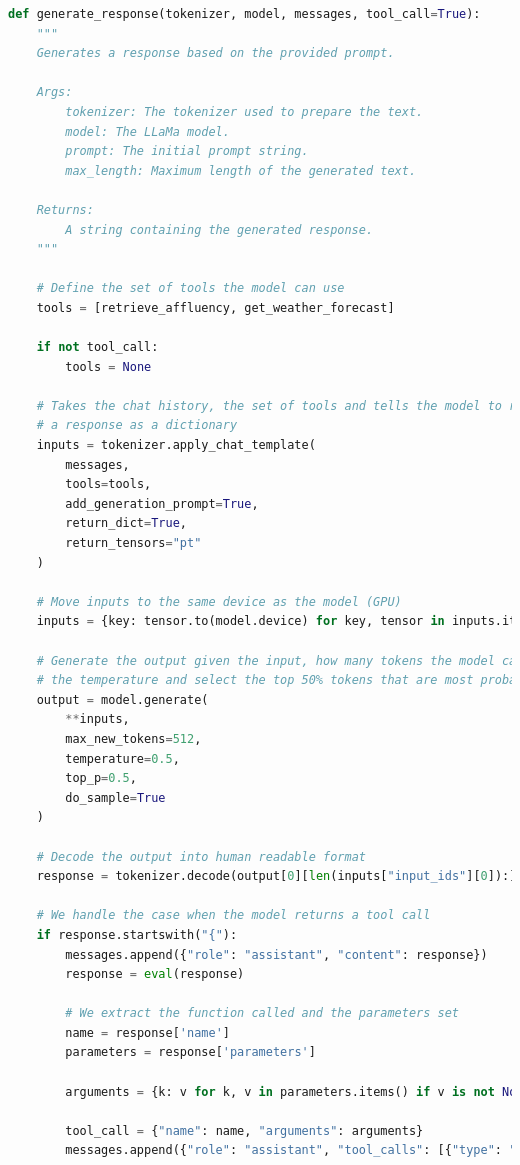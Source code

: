 \begin{center}
\begin{lstlisting}[language=Python, frame=single, caption=\texttt{generate\_response()} Function.]
def generate_response(tokenizer, model, messages, tool_call=True):
    """
    Generates a response based on the provided prompt.

    Args:
        tokenizer: The tokenizer used to prepare the text.
        model: The LLaMa model.
        prompt: The initial prompt string.
        max_length: Maximum length of the generated text.

    Returns:
        A string containing the generated response.
    """

    # Define the set of tools the model can use
    tools = [retrieve_affluency, get_weather_forecast]

    if not tool_call:
        tools = None

    # Takes the chat history, the set of tools and tells the model to return
    # a response as a dictionary
    inputs = tokenizer.apply_chat_template(
        messages,
        tools=tools,
        add_generation_prompt=True,
        return_dict=True,
        return_tensors="pt"
    )

    # Move inputs to the same device as the model (GPU)
    inputs = {key: tensor.to(model.device) for key, tensor in inputs.items()}

    # Generate the output given the input, how many tokens the model can use,
    # the temperature and select the top 50% tokens that are most probable
    output = model.generate(
        **inputs,
        max_new_tokens=512,
        temperature=0.5,
        top_p=0.5,
        do_sample=True
    )

    # Decode the output into human readable format
    response = tokenizer.decode(output[0][len(inputs["input_ids"][0]):], skip_special_tokens=True)

    # We handle the case when the model returns a tool call
    if response.startswith("{"):
        messages.append({"role": "assistant", "content": response})
        response = eval(response)

        # We extract the function called and the parameters set
        name = response['name']
        parameters = response['parameters']

        arguments = {k: v for k, v in parameters.items() if v is not None}

        tool_call = {"name": name, "arguments": arguments}
        messages.append({"role": "assistant", "tool_calls": [{"type": "function", "function": tool_call}]})


\end{lstlisting}
\end{center}
